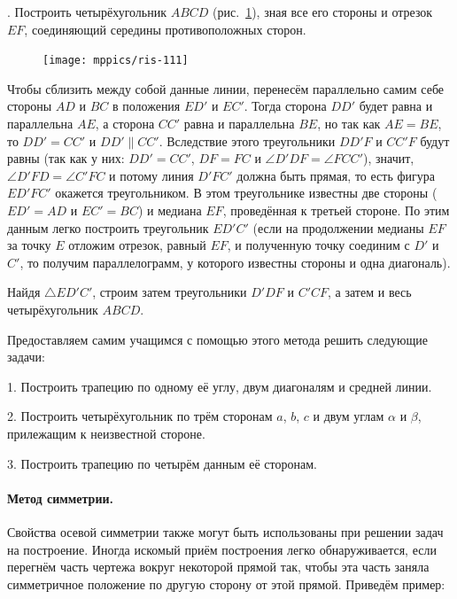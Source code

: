 \documentclass[oneside]{book}
\begin{document}
\smallskip
{}.
Построить четырёхугольник $ABCD$ (рис.~\ref{1938/ris-111}), зная все его стороны и отрезок $EF$, соединяющий середины противоположных сторон.

\begin{figure}
\centering
\texttt{[image: mppics/ris-111]}
\caption{}\label{1938/ris-111}
\end{figure}

Чтобы сблизить между собой данные линии, перенесём параллельно самим себе стороны $AD$ и $BC$ в положения $ED'$ и $EC'$.
Тогда сторона $DD'$ будет равна и параллельна $AE$, а сторона $CC'$ равна и параллельна $BE$, но так как $AE=BE$, то $DD'=CC'$ и $DD'\parallel CC'$.
Вследствие этого треугольники $DD'F$ и $CC'F$ будут равны (так как у них:
$DD' = CC'$, $DF=FC$ и $\angle D'DF=\angle FCC'$), значит, $\angle D'FD=\angle C'FC$ и потому линия $D'FC'$ должна быть прямая, то есть
фигура $ED'FC'$ окажется треугольником.
В этом треугольнике известны две стороны ($ED'=AD$ и $EC'=BC$) и медиана $EF$, проведённая к третьей стороне.
По этим данным легко построить треугольник $ED'C'$ (если на продолжении медианы $EF$ за точку $E$ отложим отрезок, равный $EF$, и полученную точку соединим с $D'$ и $C'$, то получим параллелограмм, у которого известны стороны и одна диагональ).

Найдя $\triangle ED'C'$, строим затем треугольники $D'DF$ и $C'CF$, а затем и весь четырёхугольник $ABCD$.

Предоставляем самим учащимся с помощью этого метода решить следующие задачи:

\medskip

1.
Построить трапецию по одному её углу, двум диагоналям и средней линии.

2.
Построить четырёхугольник по трём сторонам $a$, $b$, $c$ и двум углам $\alpha$ и $\beta$, прилежащим к неизвестной стороне.

3.
Построить трапецию по четырём данным её сторонам.


\paragraph{Метод симметрии.}\label{1938/102}
Свойства осевой симметрии также могут быть использованы при решении задач на построение.
Иногда искомый приём построения легко обнаруживается, если перегнём часть чертежа вокруг некоторой прямой так, чтобы эта часть заняла симметричное положение по другую сторону от этой прямой.
Приведём пример:
\end{document}
